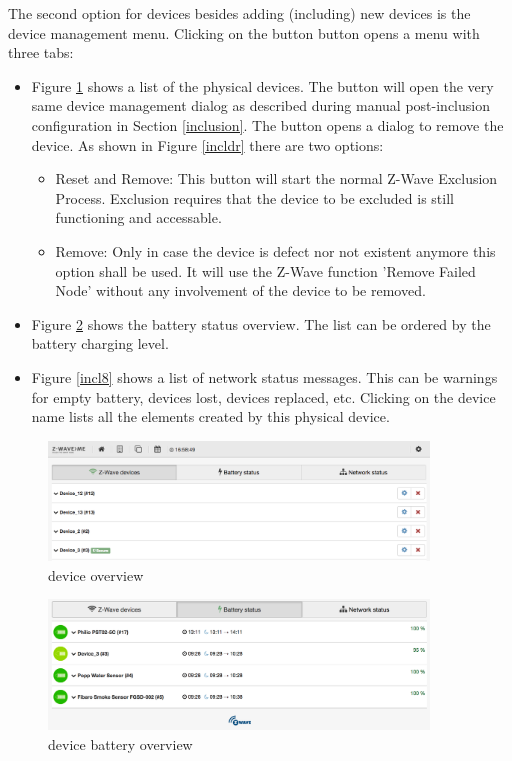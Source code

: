 The second option for \zwave devices besides adding (including) new devices is the device 
management menu. Clicking on the button  button opens a menu with three tabs:

\begin{itemize}
\item Figure \ref{incl6} shows a list of the physical \zwave devices. The \keystroke{*} button 
will open the very same device management dialog as described during manual post-inclusion 
configuration in Section \ref{inclusion}. The  button opens a dialog to remove 
the device. As shown in Figure \ref{incldr} there are two options:
\begin{itemize}
\item Reset and Remove: This button will start the normal Z-Wave Exclusion Process. Exclusion
requires that the device to be excluded is still functioning and accessable.
\item Remove: Only in case the device is defect nor not existent anymore this option shall be used.
It will use the Z-Wave function 'Remove Failed Node' without any involvement of the device to be removed.
\end{itemize}
\item Figure \ref{incl7} shows the battery status overview. The list can be ordered by 
the battery charging level.
\item Figure \ref{incl8} shows a list of network status messages. This can be warnings 
for empty battery, devices lost, devices replaced, etc. Clicking on the device name 
lists all the elements created by this physical device.
\end{itemize}


\begin{figure}
\begin{center}
\includegraphics[width=0.9\textwidth]{pngs/cap4/incl6.png}
\caption{\zwave device overview}
\label{incl6}
\end{center}
\end{figure}

\begin{figure}
\begin{center}
\includegraphics[width=0.9\textwidth]{pngs/cap4/incl7.png}
\caption{\zwave device battery overview}
\label{incl7}
\end{center}
\end{figure}

